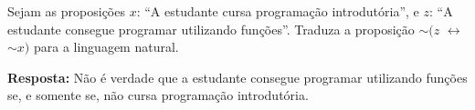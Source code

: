 \documentclass{ufcdocument}
\begin{document}
\def\course{Lógica para Ciência da Computação}
\def\prof{Esdras Lins Bispo Jr.}
\def\semester{2026.1}
\def\codeCourse{ICE0239}
\def\registration{}
\def\student{}
\def\graduate{Bacharelado em Ciência da Computação}
\def\theme{Avaliação da Competência LCC C1.1:\\ \texttt{Conversão da linguagem simbólica para a natural.}\\
07 de abril de 2026
}
    \makeheader
    
    \vspace{0.5cm}
    
    \begin{question}
        \item Sejam as proposições $x$: ``A estudante cursa programação introdutória'', e $z$: ``A estudante consegue programar utilizando funções''. Traduza  a proposição $\sim (z$ $\leftrightarrow$ $\sim x)$ para a linguagem natural.
    \end{question}

    \vspace{0.3cm}
        
    {\color{blue} {\bf Resposta:} Não é verdade que a estudante consegue programar utilizando funções se, e somente se, não cursa programação introdutória.}
 
    \vfill
\end{document}
